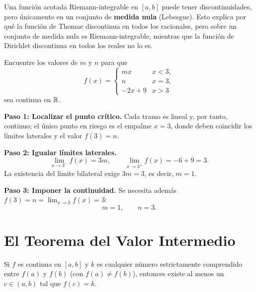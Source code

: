 \begin{rem}
Una función acotada Riemann-integrable en $[a,b]$ puede tener
discontinuidades, pero únicamente en un conjunto de \textbf{medida nula}
(Lebesgue). Esto explica por qué la función de Thomae discontinua en todos
los racionales, pero sobre un conjunto de medida nula es
Riemann-integrable, mientras que la función de Dirichlet discontinua en
todos los reales no lo es.
\end{rem}

\begin{example}
Encuentre los valores de $m$ y $n$ para que
\[
  f(x) =
  \begin{cases}
    mx & x<3, \\ n & x=3, \\ -2x+9 & x>3
  \end{cases}
\]
sea continua en ${\mathbb R}$.

\begin{myproof}
\textbf{Paso 1: Localizar el punto crítico.} Cada tramo es lineal y, por
tanto, continuo; el único punto en riesgo es el empalme $x=3$, donde deben
coincidir los límites laterales y el valor $f(3)=n$.

\textbf{Paso 2: Igualar límites laterales.}
\[
  \lim_{x\to 3^-}f(x) = 3m, \qquad
  \lim_{x\to 3^+}f(x) = -6+9 = 3.
\]
La existencia del límite bilateral exige $3m = 3$, es decir, $m=1$.

\textbf{Paso 3: Imponer la continuidad.} Se necesita además
$f(3) = n = \lim_{x\to 3}f(x) = 3$:
\[
  \boxed{m = 1, \qquad n = 3.}
\]
\end{myproof}
\end{example}

\section{El Teorema del Valor Intermedio}

\begin{theorem}
Si $f$ es continua en $[a,b]$ y $k$ es cualquier número estrictamente
comprendido entre $f(a)$ y $f(b)$ (con $f(a)\neq f(b)$), entonces existe
al menos un $c\in(a,b)$ tal que $f(c)=k$.
\end{theorem}

